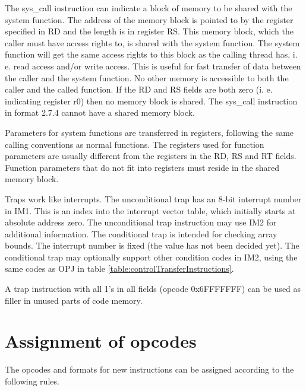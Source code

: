 \documentclass[forwardcom.tex]{subfiles}
\begin{document}
The sys\_call instruction can indicate a block of memory to be shared with the system function. The address of the memory block is pointed to by the register specified in RD and the length is in register RS. This memory block, which the caller must have access rights to, is shared with the system function. The system function will get the same access rights to this block as the calling thread has, i. e. read access and/or write access. This is useful for fast transfer of data between the caller and the system function. No other memory is accessible to both the caller and the called function. If the RD and RS fields are both zero (i. e. indicating register r0) then no memory block is shared. The sys\_call instruction in format 2.7.4 cannot have a shared memory block.
\vspace{2mm}

Parameters for system functions are transferred in registers, following the same calling conventions as normal functions. The registers used for function parameters are usually different from the registers in the RD, RS and RT fields. Function parameters that do not fit into registers must reside in the shared memory block.
\vspace{2mm}

\label{traps}
Traps work like interrupts. The unconditional trap has an 8-bit interrupt number in IM1. This is an index into the interrupt vector table, which initially starts at absolute address zero. The unconditional trap instruction may use IM2 for additional information. The conditional trap is intended for checking array bounds. The interrupt number is fixed (the value has not been decided yet). The conditional trap may optionally support other condition codes in IM2, using the same codes as OPJ in table \ref{table:controlTransferInstructions}.
\vspace{2mm}

A trap instruction with all 1's in all fields (opcode 0x6FFFFFFF) can be used as filler in unused parts of code memory.

\section{Assignment of opcodes}
The opcodes and formats for new instructions can be assigned according to the following rules.
\end{document}
